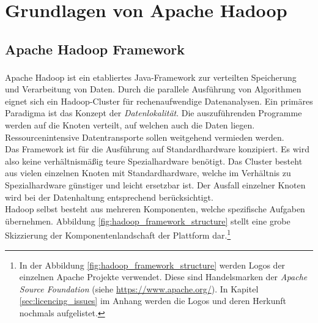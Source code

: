 \chapter{Grundlagen von Apache Hadoop\textsuperscript{\textregistered}}
\label{ch:theory_hadoop}

\section{Apache Hadoop Framework}
\label{sec:theory_hadoop}
\noindent
Apache Hadoop\textsuperscript{\textregistered} ist ein etabliertes Java-Framework zur verteilten Speicherung und Verarbeitung von Daten. Durch die parallele Ausführung von Algorithmen eignet sich ein Hadoop-Cluster für rechenaufwendige Datenanalysen. Ein primäres Paradigma ist das Konzept der \textit{Datenlokalität}. Die auszuführenden Programme werden auf die Knoten verteilt, auf welchen auch die Daten liegen. Ressourcenintensive Datentransporte sollen weitgehend vermieden werden.\cite[S. 20 ff.]{big_data_praxis}\\ 
Das Framework ist für die Ausführung auf Standardhardware konzipiert. Es wird also keine verhältnismäßig teure Spezialhardware benötigt. Das Cluster besteht aus vielen einzelnen Knoten mit Standardhardware, welche im Verhältnis zu Spezialhardware günstiger und leicht ersetzbar ist. Der Ausfall einzelner Knoten wird bei der Datenhaltung entsprechend berücksichtigt. \\

\noindent
Hadoop selbst besteht aus mehreren Komponenten, welche spezifische Aufgaben übernehmen. Abbildung \ref{fig:hadoop_framework_structure} stellt eine grobe Skizzierung der Komponentenlandschaft der Plattform dar.\footnote{In der Abbildung \ref{fig:hadoop_framework_structure} werden Logos der einzelnen Apache Projekte verwendet. Diese sind Handelsmarken der \textit{Apache Source Foundation} (siehe \url{https://www.apache.org/}). In Kapitel \ref{sec:licencing_issues} im Anhang werden die Logos und deren Herkunft nochmals aufgelistet.}\\

